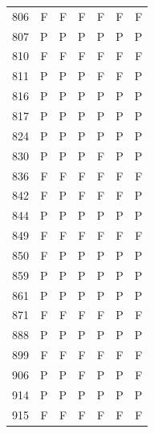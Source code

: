 \begin{table}[!htbp]
\begin{tabular*}{\textwidth}{@{\extracolsep{\fill}}rrrrrrr}
806 & F & F & F & F & F & F\\
807 & P & P & P & P & P & P\\
810 & F & F & F & F & F & F\\
811 & P & P & P & F & F & P\\
816 & P & P & P & P & P & P\\
817 & P & P & P & P & P & P\\
824 & P & P & P & P & P & P\\
830 & P & P & P & F & P & P\\
836 & F & F & F & F & F & F\\
842 & F & P & F & F & F & P\\
844 & P & P & P & P & P & P\\
849 & F & F & F & F & F & F\\
850 & F & P & P & P & P & P\\
859 & P & P & P & P & P & P\\
861 & P & P & P & P & P & P\\
871 & F & F & F & F & P & F\\
888 & P & P & P & P & P & P\\
899 & F & F & F & F & F & F\\
906 & P & P & F & P & P & F\\
914 & P & P & P & P & P & P\\
915 & F & F & F & F & F & F\\
\bottomrule\end{tabular*}\end{table}
\clearpage
